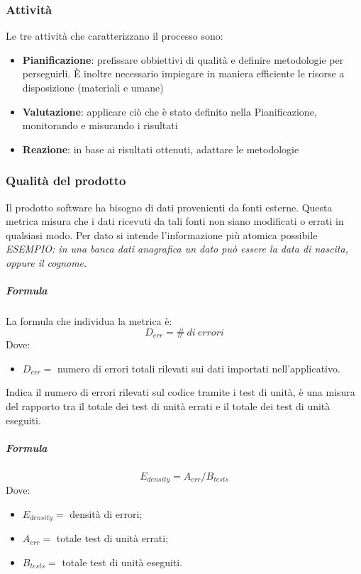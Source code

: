 		\subsubsection{Attività}
		Le tre attività che caratterizzano il processo sono:
		\begin{itemize}
			\item \textbf{Pianificazione}: prefissare obbiettivi di qualità e definire metodologie per perseguirli. È inoltre necessario impiegare in maniera efficiente le risorse a disposizione (materiali e umane)
			\item \textbf{Valutazione}: applicare ciò che è stato definito nella Pianificazione, monitorando e misurando i risultati
			\item \textbf{Reazione}: in base ai risultati ottenuti, adattare le metodologie
		\end{itemize}
		
		\subsubsection{Qualità del prodotto}
        Il prodotto software ha bisogno di dati provenienti da fonti esterne. Questa 
        metrica misura che i dati ricevuti da tali fonti non siano modificati o errati 
        in qualsiasi modo. Per dato si intende l'informazione più atomica possibile
        \textit{ESEMPIO: in una banca dati anagrafica un dato può essere la data di 
        nascita, oppure il cognome.}
        \subparagraph{Formula}
        La formula che individua la metrica è:
        \begin{displaymath}
          D_{err} = \#\ di\ errori
        \end{displaymath}
        Dove:
        \begin{itemize}
        \item[]$D_{err} =$  numero di errori totali rilevati sui dati importati 
        nell'applicativo.
        \end{itemize}
        Indica il numero di errori rilevati sul codice tramite i test di unità, è una 
        misura del rapporto tra il totale dei test di unità errati e il totale dei test 
        di unità eseguiti.
        \subparagraph{Formula}
        \begin{displaymath}
          E_{density} = A_{err}/B_{tests}
        \end{displaymath}
        Dove:
        \begin{itemize}
          \item[] $E_{density} =$ densità di errori;
          \item[] $A_{err} =$ totale test di unità errati;  
          \item[] $B_{tests} =$ totale test di unità eseguiti.
        \end{itemize}
        
